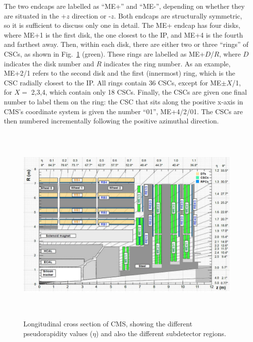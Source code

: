 The two endcaps are labelled as ``ME+'' and ``ME-'', depending on whether they are situated in the +$z$ direction or -$z$.
Both endcaps are structurally symmetric, so it is sufficient to discuss only one in detail.
The ME+ endcap has four disks, where ME+1 is the first disk, the one closest to the IP, and ME+4 is the fourth and farthest away. 
Then, within each disk, there are either two or three ``rings'' of CSCs, as shown in Fig.~\ref{fig:cms_long_view_subdetectors} (green).
These rings are labelled as ME+$D$/$R$, where $D$ indicates the disk number and $R$ indicates the ring number.
As an example, ME+2/1 refers to the second disk and the first (innermost) ring, which is the CSC radially closest to the IP.
All rings contain 36 CSCs, except for ME$\pm X$/1, for $X=$ 2,3,4, which contain only 18 CSCs.
Finally, the CSCs are given one final number to label them on the ring:
the CSC that sits along the positive x-axis in CMS's coordinate system is given the number ``01'', \eg ME+4/2/01. 
The CSCs are then numbered incrementally following the positive azimuthal direction.
\begin{figure}[pbth]
\centering
\includegraphics[width=15cm,height=10cm,keepaspectratio]{figures/cms/cms_longitudinal_view.png}
    \caption{
    Longitudinal cross section of CMS, showing the different pseudorapidity values ($\eta$) and also the different subdetector regions.
    }
    \label{fig:cms_long_view_subdetectors}
\end{figure}

